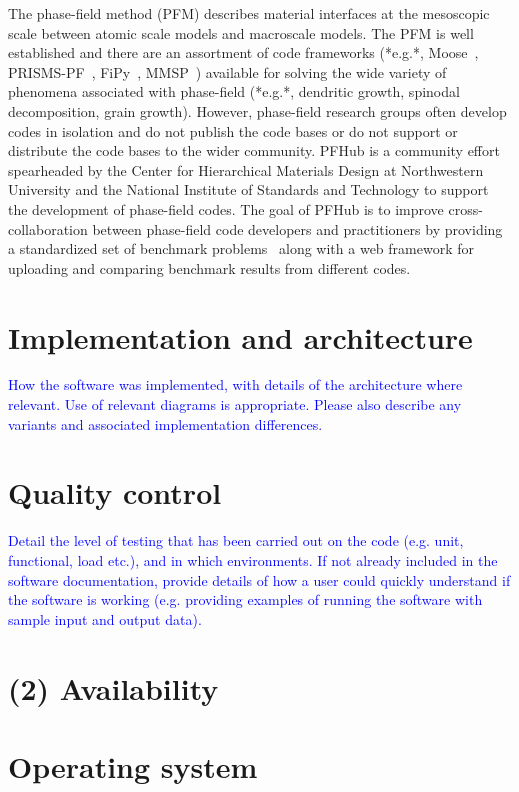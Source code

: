 \documentclass{jors}
\begin{document}
The phase-field method (PFM) describes material interfaces at the
mesoscopic scale between atomic scale models and macroscale models.
The PFM is well established and there are an assortment of code
frameworks (*e.g.*, Moose~\cite{moose}, PRISMS-PF~\cite{prisms-pf},
FiPy~\cite{fipy}, MMSP~\cite{mmsp}) available for solving the wide
variety of phenomena associated with phase-field (*e.g.*, dendritic
growth, spinodal decomposition, grain growth). However, phase-field
research groups often develop codes in isolation and do not publish
the code bases or do not support or distribute the code bases to the
wider community. PFHub is a community effort spearheaded by the Center
for Hierarchical Materials Design at Northwestern University and the
National Institute of Standards and Technology to support the
development of phase-field codes. The goal of PFHub is to improve
cross-collaboration between phase-field code developers and
practitioners by providing a standardized set of benchmark
problems~\cite{bm1, bm2} along with a web framework for uploading and
comparing benchmark results from different codes.

\section*{Implementation and architecture}

\textcolor{blue}{How the software was implemented, with details of the architecture where relevant. Use of relevant diagrams is appropriate. Please also describe any variants and associated implementation differences.}


\section*{Quality control}

\textcolor{blue}{Detail the level of testing that has been carried out on the code (e.g. unit, functional, load etc.), and in which environments. If not already included in the software documentation, provide details of how a user could quickly understand if the software is working (e.g. providing examples of running the software with sample input and output data). }

\section*{(2) Availability}
\vspace{0.5cm}
\section*{Operating system}
\end{document}
